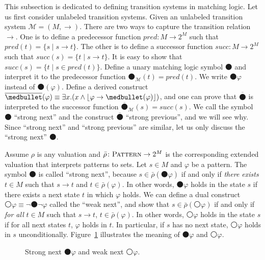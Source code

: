 \documentclass[acmsmall,review,anonymous]{acmart}
\newcommand{\imp}{\to}
\newcommand{\Pattern}{\textnormal{\textsc{Pattern}}}
\newcommand{\MM}{\mathcal{M}}
\newcommand{\pset}[1]{2^{#1}}
\newcommand{\barrho}{\bar{\rho}}
\newcommand{\widebar}[1]{\overline{#1}}
\DeclarePairedDelimiter{\floor}{\lfloor}{\rfloor}
\newcommand{\wnext}{{\medcirc}}
\newcommand{\snext}{{\medbullet}}
\newcommand{\sprev}{{\widebar{\snext}}}
\newcommand{\pred}{\mathit{pred}}
\newcommand{\succc}{\mathit{succ}}
\begin{document}
This subsection is dedicated to defining transition systems in matching logic.
Let us first consider unlabeled transition systems.
Given an unlabeled transition system $\MM = (M,\to)$.
There are two ways to capture the transition relation $\to$.
One is to define a predecessor function $\pred \colon M \to \pset{M}$
such that $\pred(t) = \{s \mid s \to t\}$.
The other is to define a successor function $\succc \colon M\to \pset{M}$
such that $\succc(s) = \{ t \mid s \to t \}$.
It is easy to show that $\succc(s) = \{ t \mid s \in \pred(t) \}$.
Define a unary matching logic symbol $\snext$
and interpret it to the predecessor function $\snext_\MM(t) = \pred(t)$.
We write $\snext \varphi$ instead of $\snext(\varphi)$.
Define a derived construct
$\sprev(\varphi) \equiv \exists x . (x \wedge \floor{\varphi \imp \snext(\varphi)})$,
and one can prove that $\sprev$ is interpreted to the successor function
$\sprev_\MM(s) = \succc(s)$.
We call the symbol $\snext$ ``strong next'' and the construct $\sprev$ ``strong previous'',
and we will see why.
Since ``strong next'' and ``strong previous'' are similar, let us only discuss
the ``strong next'' $\snext$.

Assume $\rho$ is any valuation
and $\barrho \colon \Pattern \to \pset{M}$ is the corresponding extended valuation
that interprets patterns to sets.
Let $s \in M$ and $\varphi$ be a pattern.
The symbol $\snext$ is called ``strong next'', because
$s \in \barrho(\snext \varphi)$ if and only if  \emph{there exists} $t \in M$ such that
$s \to t$ and $t \in \barrho(\varphi)$.
In other words, $\snext \varphi$ holds in the state $s$ if
there exists a next state $t$ in which $\varphi$ holds.
We can define a dual construct $\wnext \varphi \equiv \neg \snext \neg \varphi$
called the ``weak next'', and show that
$s \in \barrho(\wnext \varphi)$ if and only if
\emph{for all} $t \in M$ such that $s \to t$, $t \in \barrho(\varphi)$.
In other words, $\wnext \varphi$ holds in the state $s$ if
for all next states $t$, $\varphi$ holds in $t$.
In particular, if $s$ has no next state, $\wnext \varphi$ holds in $s$ unconditionally.
Figure~\ref{fig_snext_wnext} illustrates the meaning of $\snext \varphi$ and $\wnext \varphi$.
\begin{figure}
\caption{Strong next $\snext \varphi$ and weak next $\wnext \varphi$.}
\label{fig_snext_wnext}
\end{figure}
\end{document}
